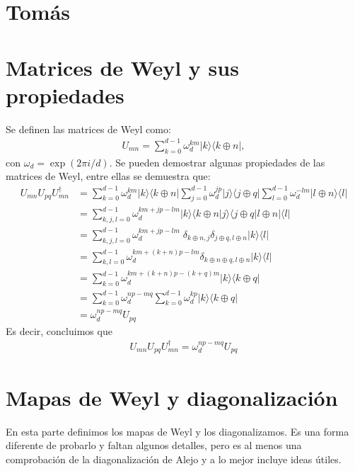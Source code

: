 \newpage
\section*{Tomás}
%
\section{Matrices de Weyl y sus propiedades}
Se definen las matrices de Weyl como:
\begin{align*}
U_{mn} = \sum_{k = 0}^{d-1} \omega_d^{km} |k\rangle \langle k \oplus n |,
\end{align*}
con $\omega_d = \exp(2\pi  i /d)$. Se pueden demostrar algunas propiedades de las matrices de Weyl, entre ellas se demuestra que:
\begin{align*}
U_{mn} U_{pq} U_{mn}^{\dagger} & = \sum_{k = 0}^{d-1} \omega_d^{km} |k\rangle \langle k \oplus n |   \sum_{j = 0}^{d-1} \omega_d^{jp} |j\rangle \langle j \oplus q |   \sum_{l = 0}^{d-1} \omega_d^{-lm} | l \oplus n\rangle \langle l| \\
& = \sum_{k,j,l=0}^{d-1} \omega_d^{km+jp-lm} |k \rangle \langle k \oplus n| j \rangle \langle j \oplus q | l \oplus n| \langle l | \\
& = \sum_{k,j,l=0}^{d-1} \omega_d^{km+jp-lm} \; \delta_{k\oplus n, j} \delta_{j\oplus q, l \oplus n} |k \rangle \langle l | \\
& = \sum_{k,l=0}^{d-1} \omega_d^{km + (k + n)p - lm} \delta_{k \oplus n \oplus q , l \oplus n} |k \rangle \langle l | \\
&= \sum_{k=0}^{d-1} \omega_d^{km + (k+n)p - (k+q)m} |k \rangle \langle k \oplus q | \\
& = \sum_{k=0}^{d-1} \omega_d^{np-mq} \sum_{k=0}^{d-1} \omega_d^{kp} |k \rangle \langle k \oplus q | \\
&=  \omega_d^{np-mq} U_{pq} 
\end{align*}
Es decir, concluimos que
\begin{align}
\label{conmutación matrices de Weyl}
U_{mn} U_{pq} U_{mn}^{\dagger}  = \omega_d^{np-mq} U_{pq} 
\end{align}

\section{Mapas de Weyl y diagonalización}
En esta parte definimos los mapas de Weyl y los diagonalizamos. Es una forma diferente de probarlo y faltan algunos detalles, pero es al menos una comprobación de la diagonalización de Alejo y a lo mejor incluye ideas útiles. 

